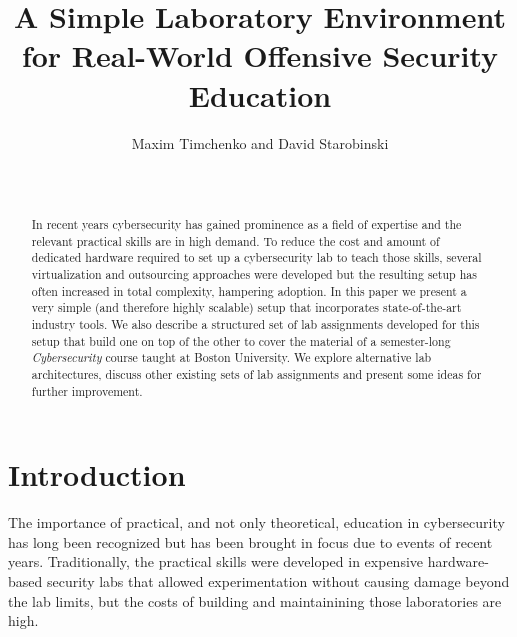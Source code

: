\documentclass{sig-alternate-2013}
\begin{document}
\title{A Simple Laboratory Environment\\for Real-World Offensive Security Education}
\author{
	\alignauthor Maxim Timchenko and David Starobinski\\
	\\
	\\
}
\maketitle

\begin{abstract}
In recent years cybersecurity has gained prominence as a field of expertise 
and the relevant practical skills are in high demand. To reduce the cost and amount 
of dedicated hardware required to set up a cybersecurity lab to teach those skills,
several virtualization and outsourcing approaches were developed 
but the resulting setup has often increased in total complexity, hampering adoption. 
In this paper we present a very simple (and therefore
highly scalable) setup that incorporates state-of-the-art industry tools. We also describe
a structured set of lab assignments developed for this setup that build one on top
of the other to cover the material of a semester-long \emph{Cybersecurity} course 
taught at Boston University. We explore alternative lab architectures, discuss other
existing sets of lab assignments and present some ideas for further improvement.
\end{abstract}


\section{Introduction}
The importance of practical, and not only theoretical, education in cybersecurity has long been 
recognized but has been brought in focus due to events of recent years. Traditionally, the practical
skills were developed in expensive hardware-based security labs that allowed experimentation
without causing damage beyond the lab limits, but the costs of building and maintainining those 
laboratories are high. 
\end{document}
